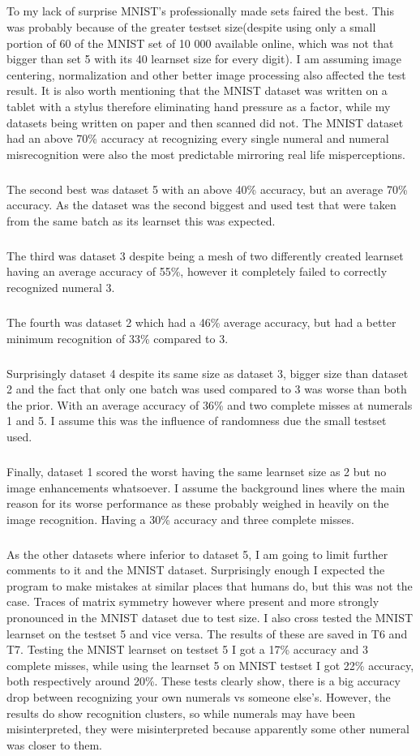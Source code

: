 \documentclass{article}
\begin{document}
	\paragraph{}
	\subparagraph{}
	To my lack of surprise MNIST’s professionally made sets faired the best. This was probably because of the greater testset size(despite using only a small portion of 60 of the MNIST set of 10 000 available online, which was not that bigger than set 5 with its 40 learnset size for every digit). I am assuming image centering, normalization and other better image processing also affected the test result. 
	It is also worth mentioning that the MNIST dataset was written on a tablet with a stylus therefore eliminating hand pressure as a factor, while my datasets being written on paper and then scanned did not.
	The MNIST dataset had an above 70\% accuracy at recognizing every single numeral and numeral misrecognition were also the most predictable mirroring real life misperceptions.
	\subparagraph{}
	The second best was dataset 5 with an above 40\% accuracy, but an average 70\% accuracy. As the dataset was the second biggest and used test that were taken from the same batch as its learnset this was expected.
	\subparagraph{}
	The third was dataset 3 despite being a mesh of two differently created learnset having an average accuracy of 55\%, however it completely failed to correctly recognized numeral 3.
	\subparagraph{}
	The fourth was dataset 2 which had a 46\% average accuracy, but had a better minimum recognition of 33\% compared to 3.
	\subparagraph{}
	Surprisingly dataset 4 despite its same size as dataset 3, bigger size than dataset 2 and the fact that only one batch was used compared to 3 was worse than both the prior. With an average accuracy of 36\% and two complete misses at numerals 1 and 5. I assume this was the influence of randomness due the small testset used.
	\subparagraph{}
	Finally, dataset 1 scored the worst having the same learnset size as 2 but no image enhancements whatsoever. I assume the background lines where the main reason for its worse performance as these probably weighed in heavily on the image recognition. Having a 30\% accuracy and three complete misses.
	\subparagraph{}
	As the other datasets where inferior to dataset 5, I am going to limit further comments to it and the MNIST dataset.
	Surprisingly enough I expected the program to make mistakes at similar places that humans do, but this was not the case. 
	Traces of matrix symmetry however where present and more strongly pronounced in the MNIST dataset due to test size.
	I also cross tested the MNIST learnset on the testset 5 and vice versa. The results of these are saved in T6 and T7.
	Testing the MNIST learnset on testset 5 I got a 17\% accuracy and 3 complete misses, while using the learnset 5 on MNIST testset I got 22\% accuracy, both respectively around 20\%.
	These tests clearly show, there is a big accuracy drop between recognizing your own numerals vs someone else’s.
	However, the results do show recognition clusters, so while numerals may have been misinterpreted, they were misinterpreted because apparently some other numeral was closer to them.
	
\end{document}
